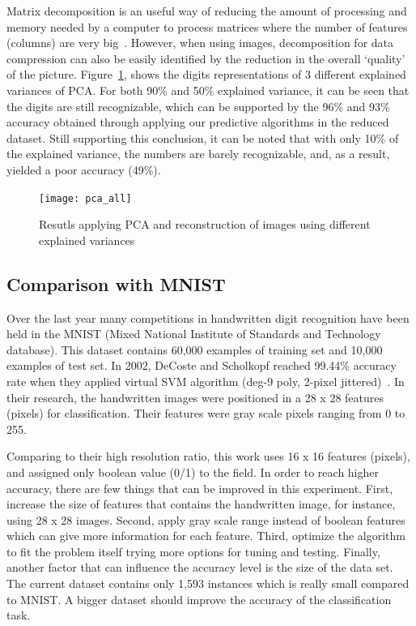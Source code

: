 \documentclass[letterpaper,10pt]{article}
\theoremstyle{mytheor}
\begin{document}
Matrix decomposition is an useful way of reducing the amount of processing and memory needed by a computer to process matrices where the number of features (columns) are very big~\cite{rajaraman2012mining}. However, when using images, decomposition for data compression can also be easily identified by the reduction in the overall ‘quality’ of the picture. Figure~\ref{fig:3}, shows the digits representations of 3 different explained variances of PCA. For both 90\% and 50\% explained variance, it can be seen that the digits are still recognizable, which can be supported by the 96\% and 93\% accuracy obtained through applying our predictive algorithms in the reduced dataset. Still supporting this conclusion, it can be noted that with only 10\% of the explained variance, the numbers are barely recognizable, and, as a result, yielded a poor accuracy (49\%).

\begin{figure}[H]
\texttt{[image: pca\_all]}
\centering
\caption{Resutls applying PCA and reconstruction of images using different  explained variances}
\label{fig:3}
\end{figure}



\subsection{Comparison with MNIST}

Over the last year many competitions in handwritten digit recognition have been held in the MNIST (Mixed National Institute of Standards and Technology database). This dataset contains 60,000 examples of training set and 10,000 examples of test set. In 2002, DeCoste and Scholkopf reached 99.44\% accuracy rate when they applied virtual SVM algorithm (deg-9 poly, 2-pixel jittered)~\cite{decoste2002training}. In their research, the handwritten images were positioned in a 28 x 28 features (pixels) for classification. Their features were gray scale pixels ranging from 0 to 255.

Comparing to their high resolution ratio, this work uses 16 x 16 features (pixels), and assigned only boolean value (0/1) to the field. In order to reach higher accuracy, there are few things that can be improved in this experiment. First, increase the size of features that contains the handwritten image, for instance, using 28 x 28 images. Second, apply gray scale range instead of boolean features which can give more information for each feature. Third, optimize the algorithm to fit the problem itself trying more options for tuning and testing. Finally, another factor that can influence the accuracy level is the size of the data set. The current dataset contains only 1,593 instances which is really small compared to MNIST. A bigger dataset should improve the accuracy of the classification task.
\end{document}
